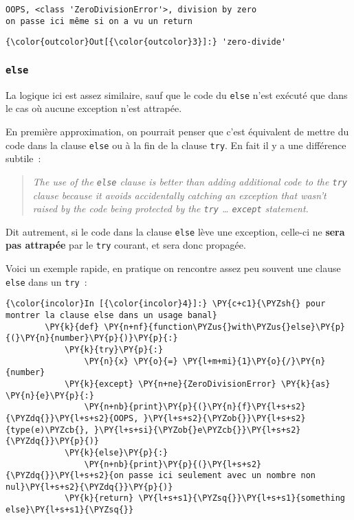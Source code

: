     \begin{Verbatim}[commandchars=\\\{\},frame=single,framerule=0.3mm,rulecolor=\color{cellframecolor}]
OOPS, <class 'ZeroDivisionError'>, division by zero
on passe ici même si on a vu un return
\end{Verbatim}

\begin{Verbatim}[commandchars=\\\{\},frame=single,framerule=0.3mm,rulecolor=\color{cellframecolor}]
{\color{outcolor}Out[{\color{outcolor}3}]:} 'zero-divide'
\end{Verbatim}
            
    \hypertarget{else}{%
\subsubsection{\texorpdfstring{\texttt{else}}{else}}\label{else}}

    La logique ici est assez similaire, sauf que le code du \texttt{else}
n'est exécuté que dans le cas où aucune exception n'est attrapée.

    En première approximation, on pourrait penser que c'est équivalent de
mettre du code dans la clause \texttt{else} ou à la fin de la clause
\texttt{try}. En fait il y a une différence subtile~:

\begin{quote}
\emph{The use of the \texttt{else} clause is better than adding
additional code to the \texttt{try} clause because it avoids
accidentally catching an exception that wasn't raised by the code being
protected by the \texttt{try} \ldots{} \texttt{except} statement.}
\end{quote}

Dit autrement, si le code dans la clause \texttt{else} lève une
exception, celle-ci ne \textbf{sera pas attrapée} par le \texttt{try}
courant, et sera donc propagée.

    Voici un exemple rapide, en pratique on rencontre assez peu souvent une
clause \texttt{else} dans un \texttt{try}~:

    \begin{Verbatim}[commandchars=\\\{\},frame=single,framerule=0.3mm,rulecolor=\color{cellframecolor}]
{\color{incolor}In [{\color{incolor}4}]:} \PY{c+c1}{\PYZsh{} pour montrer la clause else dans un usage banal}
        \PY{k}{def} \PY{n+nf}{function\PYZus{}with\PYZus{}else}\PY{p}{(}\PY{n}{number}\PY{p}{)}\PY{p}{:}
            \PY{k}{try}\PY{p}{:}
                \PY{n}{x} \PY{o}{=} \PY{l+m+mi}{1}\PY{o}{/}\PY{n}{number}
            \PY{k}{except} \PY{n+ne}{ZeroDivisionError} \PY{k}{as} \PY{n}{e}\PY{p}{:}
                \PY{n+nb}{print}\PY{p}{(}\PY{n}{f}\PY{l+s+s2}{\PYZdq{}}\PY{l+s+s2}{OOPS, }\PY{l+s+s2}{\PYZob{}}\PY{l+s+s2}{type(e)\PYZcb{}, }\PY{l+s+si}{\PYZob{}e\PYZcb{}}\PY{l+s+s2}{\PYZdq{}}\PY{p}{)}
            \PY{k}{else}\PY{p}{:}
                \PY{n+nb}{print}\PY{p}{(}\PY{l+s+s2}{\PYZdq{}}\PY{l+s+s2}{on passe ici seulement avec un nombre non nul}\PY{l+s+s2}{\PYZdq{}}\PY{p}{)}
            \PY{k}{return} \PY{l+s+s1}{\PYZsq{}}\PY{l+s+s1}{something else}\PY{l+s+s1}{\PYZsq{}}
\end{Verbatim}


